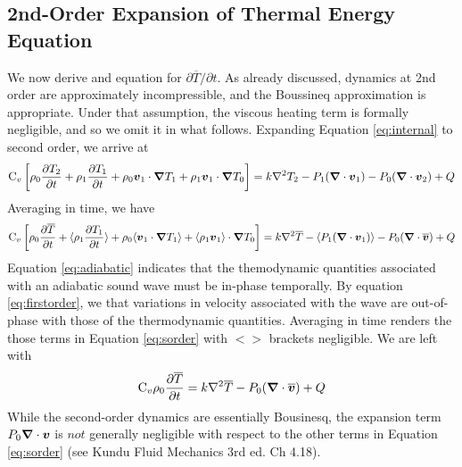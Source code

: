\subsection{2nd-Order Expansion of Thermal Energy Equation}
We now derive and equation for $\partial\overline{T}/\partial t$.  As already discussed, dynamics at 2nd order are approximately incompressible, and the Boussineq approximation is appropriate.  Under that assumption, the viscous heating term is formally negligible, and so we omit it in what follows.   Expanding Equation \ref{eq:internal} to second order, we arrive at
\begin{equation}
\mathrm{C}_v\left[\rho_0\frac{\partial T_2}{\partial t} + \rho_1\frac{\partial T_1}{\partial t} + \rho_0\boldsymbol{v}_1\cdot\boldsymbol{\nabla} T_1 + \rho_1\boldsymbol{v}_1\cdot\boldsymbol{\nabla} T_0 \right] = k\nabla^2 T_2 - P_1(\boldsymbol{\nabla}\cdot\boldsymbol{v}_1) - P_0(\boldsymbol{\nabla}\cdot\boldsymbol{v}_2) + Q
\end{equation}
Averaging in time, we have
\begin{equation}
\label{eq:sorder}
\mathrm{C}_v\left[\rho_0\frac{\partial \overline{T}}{\partial t} + \langle\rho_1\frac{\partial T_1}{\partial t}\rangle + \rho_0\langle\boldsymbol{v}_1\cdot\boldsymbol{\nabla} T_1\rangle + \langle\rho_1\boldsymbol{v}_1\rangle\cdot\boldsymbol{\nabla} T_0 \right] = 
k\nabla^2 \overline{T} - \langle P_1(\boldsymbol{\nabla}\cdot\boldsymbol{v}_1)\rangle - P_0(\boldsymbol{\nabla}\cdot\overline{\boldsymbol{v}}) + Q
\end{equation}
Equation \ref{eq:adiabatic} indicates that the themodynamic quantities associated with an adiabatic sound wave must be in-phase temporally.  By equation \ref{eq:firstorder}, we that variations in velocity associated with the wave are out-of-phase with those of the thermodynamic quantities.  Averaging in time renders the those terms in Equation \ref{eq:sorder} with $< >$ brackets negligible.  We are left with
 \begin{equation}
\label{eq:sorder}
\mathrm{C}_v\rho_0\frac{\partial \overline{T}}{\partial t}  = 
k\nabla^2 \overline{T}  - P_0(\boldsymbol{\nabla}\cdot\overline{\boldsymbol{v}}) + Q
\end{equation}
While the second-order dynamics are essentially Bousinesq, the expansion term $P_0\boldsymbol{\nabla}\cdot\boldsymbol{v}$ is $not$ generally negligible with respect to the other terms in Equation \ref{eq:sorder} (see Kundu Fluid Mechanics 3rd ed. Ch 4.18).
